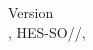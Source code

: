 \begin{titlepage}
\begin{center}
    \vfill
    {\small Version \version} \\
    {\small \Place, HES-SO//\Diploma, \Date}

\end{center}
\restoregeometry
\end{titlepage}
